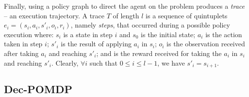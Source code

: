 \documentclass[letterpaper]{article} %
\theoremstyle{definition}
\begin{document}
Finally, using a policy graph to direct the agent on the problem produces a {\em trace} -- an execution trajectory. A trace $T$ of length $l$ is a sequence of quintuplets $e_i = (s_i, a_i, s'_i, o_i, r_i)$, namely \emph{steps}, that occurred during a possible policy execution where: $s_i$ is a state in step $i$ and $s_0$ is the initial state;
$a_i$ is the action taken in step $i$;
    $s'_i$ is the result of applying $a_i$ in $s_i$;
    $o_i$ is the observation received after taking $a_i$ and reaching $s'_i$; and is the reward received for taking the $a_i$ in $s_i$ and reaching $s'_i$. Clearly, $\forall i$ such
    that $0\leq i \leq l-1$, we have $s'_i=s_{i+1}$.




\subsection{Dec-POMDP}
\end{document}
